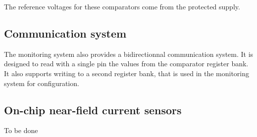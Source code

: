 The reference voltages for these comparators come from the protected supply.

\subsection{Communication system}

The monitoring system also provides a bidirectionnal communication system.
It is designed to read with a single pin the values from the comparator register bank.
It also supports writing to a second register bank, that is used in the monitoring system for configuration.


\subsection{On-chip near-field current sensors}

To be done
